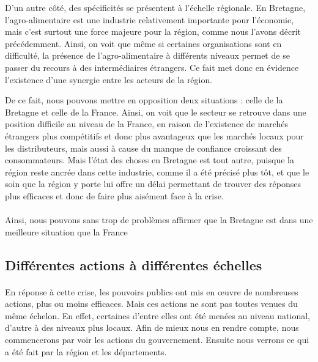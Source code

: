 \documentclass[a4paper,12pt]{report}
\begin{document}
			D’un autre côté, des spécificités se présentent à l’échelle régionale. En Bretagne, l’agro-alimentaire est une industrie relativement importante pour l’économie, mais c’est surtout une force majeure pour la région, comme nous l'avons décrit précédemment. Ainsi, on voit que même si certaines organisations sont en difficulté, la présence de l’agro-alimentaire à différents niveaux permet de se passer du recours à des intermédiaires étrangers. Ce fait met donc en évidence l’existence d’une synergie entre les acteurs de la région.

			De ce fait, nous pouvons mettre en opposition deux situations : celle de la Bretagne et celle de la France. Ainsi, on voit que le secteur se retrouve dans une position difficile au niveau de la France, en raison de l’existence de marchés étrangers plus compétitifs et donc plus avantageux que les marchés locaux pour les distributeurs, mais aussi à cause du manque de confiance croissant des consommateurs. Mais l’état des choses en Bretagne est tout autre, puisque la région reste ancrée dans cette industrie, comme il a été précisé plus tôt, et que le soin que la région y porte lui offre un délai permettant de trouver des réponses plus efficaces et donc de faire plus aisément face à la crise.

			\paragraph{}Ainsi, nous pouvons sans trop de problèmes affirmer que la Bretagne est dans une meilleure situation que la France
			
		\subsection{Différentes actions à différentes échelles}
			\paragraph{}En réponse à cette crise, les pouvoirs publics ont mis en œuvre de nombreuses actions, plus ou moins efficaces. Mais ces actions ne sont pas toutes venues du même échelon. En effet, certaines d'entre elles ont été menées au niveau national, d'autre à des niveaux plus locaux. Afin de mieux nous en rendre compte, nous commencerons par voir les actions du gouvernement. Ensuite nous verrons ce qui a été fait par la région et les départements.
\end{document}
